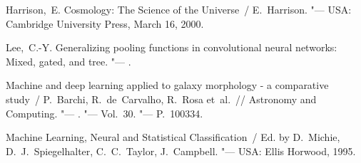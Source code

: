 \documentclass{article} %
\begin{document}

%
%

\begin{thebibliography}{1} %
  {Harrison,~E.} Cosmology: The Science of the Universe~/ E.~Harrison.
  "---
  \newblock USA: Cambridge University Press, March 16, 2000.

  {Lee,~C.-Y.} Generalizing pooling functions in convolutional neural
  networks: Mixed, gated, and tree. "---
  .

  Machine and deep learning applied to galaxy morphology - a comparative study~/
  P.~Barchi, R.~de~Carvalho, R.~Rosa et~al.~// {Astronomy and
  Computing}. "---
  . "---
  \newblock Vol.~30. "---
  \newblock P.~100334.

  Machine Learning, Neural and Statistical Classification~/ Ed. by D.~Michie,
  D.~J.~Spiegelhalter, C.~C.~Taylor, J.~Campbell. "---
  \newblock USA: Ellis Horwood, 1995.

\end{thebibliography}
\end{document}
